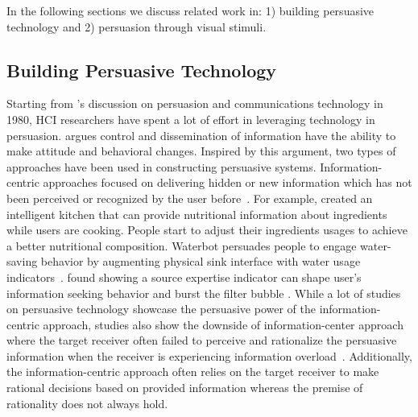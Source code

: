 
In the following sections we discuss related work in: 1) building persuasive technology and 2) persuasion through visual stimuli.

\subsection{Building Persuasive Technology}
Starting from \textcite{goehlert1980information}'s discussion on persuasion and communications technology in 1980, HCI researchers have spent a lot of effort in leveraging technology in persuasion. \textcite{goehlert1980information} argues control and dissemination of information have the ability to make attitude and behavioral changes. Inspired by this argument, two types of approaches have been used in constructing persuasive systems. Information-centric approaches focused on delivering hidden or new information which has not been perceived or recognized by the user before~\cite{LeeKF11}. For example, \textcite{chi2007enabling} created an intelligent kitchen that can provide nutritional information about ingredients while users are cooking. People start to adjust their ingredients usages to achieve a better nutritional composition. Waterbot persuades people to engage water-saving behavior by augmenting physical sink interface with water usage indicators~\cite{arroyo2005waterbot}. \textcite{liao2014expert} found showing a source expertise indicator can shape user's information seeking behavior and burst the filter bubble . While a lot of studies on persuasive technology showcase the persuasive power of the information-centric approach, studies also show the downside of information-center approach where the target receiver often failed to perceive and rationalize the persuasive information when the receiver is experiencing information overload~\cite{goehlert1980information,LeeKF11}. Additionally, the information-centric approach often relies on the target receiver to make rational decisions based on provided information whereas the premise of rationality does not always hold.

